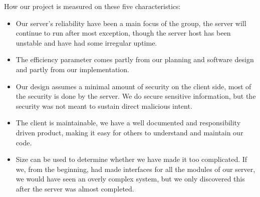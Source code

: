 How our project is measured on these five characteristics:
\begin{itemize}
 	\item Our server's reliability have been a main focus of the group, the server will continue to run after most exception, though the server host has been unstable and have had some irregular uptime.
 	\item The efficiency parameter comes partly from our planning and software design and partly from our implementation.
 	\item Our design assumes a minimal amount of security on the client side, most of the security is done by the server. We do secure sensitive information, but the security was not meant to sustain direct malicious intent.
 	\item The client is maintainable, we have a well documented and responsibility driven product, making it easy for others to understand and maintain our code. 
	\item Size can be used to determine whether we have made it too complicated. If we, from the beginning, had made interfaces for all the modules of our server, we would have seen an overly complex system, but we only discovered this after the server was almost completed. 
\end{itemize}